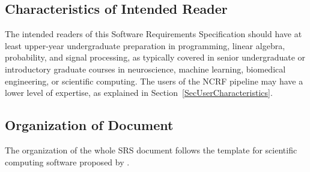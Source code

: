 \documentclass[12pt]{article}
\begin{document}

\subsection{Characteristics of Intended Reader} \label{sec-IntendedReader}

The intended readers of this Software Requirements Specification should have at least upper-year undergraduate preparation in programming, linear algebra, probability, and signal processing, as typically covered in senior undergraduate or introductory graduate courses in neuroscience, machine learning, biomedical engineering, or scientific computing.
The users of the NCRF pipeline may have a lower level of expertise, as explained in Section~\ref{SecUserCharacteristics}.



\subsection{Organization of Document}
The organization of the whole SRS document follows the template for scientific computing software proposed by 
{\cite{SmithAndLai2005, SmithEtAl2007,SmithAndKoothoor2016}}.\\
\end{document}
